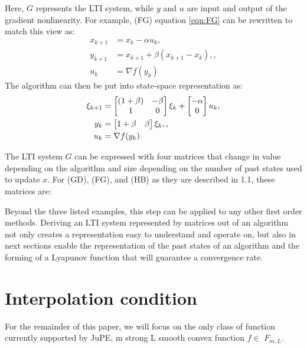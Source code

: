 Here, \(G\) represents the LTI system, while \(y\) and \(u\) are input and output of the gradient nonlinearity. For example, (FG) equation \ref{eqn:FG} can be rewritten to match this view as:
\begin{subequations} \label{eqn:FG2}
	\begin{align}
	  x_{k+1}     &=x_k-\alpha u_k \label{eq_FGstate},       \\
	  y_{k+1} &=x_{k+1}+\beta (x_{k+1}-x_k), \label{eq_FGinterpolated point}, \\
	  u_k &= \nabla f(y_k) \label{eq_FGggradient}
	\end{align}
	\end{subequations}
The algorithm can then be put into state-space representation as:
\begin{subequations} \label{eqn:FGss }
	\begin{align}
	  \xi_{k+1} &= \begin{bmatrix}(1+\beta) & -\beta\\ 1 & 0\end{bmatrix}\xi_k  + \begin{bmatrix}-\alpha\\ 0\end{bmatrix}u_k \label{eq_FGssstate}, \\
	  y_k &= \begin{bmatrix}1+\beta & \beta\end{bmatrix}\xi_k, \label{eq_FGssinterpolation},\\
	  u_k &= \nabla f(y_k) \label{eq_FGssgradient}
	\end{align}
	\end{subequations}

The LTI system \(G\) can be expressed with four matrices that change in value depending on the algorithm and size depending on the number of past states used to update \(x\). For (GD), (FG), and (HB) as they are described in 1.1, these matrices are:

Beyond the three listed examples, this step can be applied to any other first order methods. Deriving an LTI system represented by matrices out of an algorithm not only creates a representation easy to understand and operate on, but also in next sections enable the representation of the past states of an algorithm and the forming of a Lyapunov function that will guarantee a convergence rate.

\section{Interpolation condition}

For the remainder of this paper, we will focus on the only class of function currently supported by JuPE, m strong L smooth convex function \(f \in \) \(F_{m,L}\).

